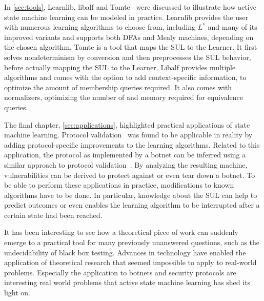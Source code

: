 \documentclass[multi,crop=false,class=article]{standalone}
\begin{document}
In \cref{sec:tools}, Learnlib, libalf and Tomte~\cite{Raffelt2009,Bollig2010,Tomte2014}
were discussed to illustrate how active state machine learning can be modeled in
practice. Learnlib provides the user with numerous learning algorithms to choose
from, including $L^*$ and many of its improved variants and supports both DFAs
and Mealy machines, depending on the chosen algorithm. Tomte is a tool that maps
the SUL to the Learner. It first solves nondeterminism by conversion and then
preprocesses the SUL behavior, before actually mapping the SUL to the Learner.
Libalf provides multiple algorithms and comes with the option to add
context-specific information, to optimize the amount of membership queries
required. It also comes with normalizers, optimizing the number of and memory
required for equivalence queries.

The final chapter, \cref{sec:applications}, highlighted practical applications of state
machine learning. Protocol validation~\cite{deRuiter2015} was found to be
applicable in reality by adding protocol-specific improvements to the
learning algorithms. Related to this application, the protocol as implemented
by a botnet can be inferred using a similar approach to protocol
validation~\cite{Cho2010}. By analyzing the resulting machine, vulnerabilities
can be derived to protect against or even tear down a botnet.
To be able to perform these applications in practice, modifications to known
algorithms have to be done. In particular, knowledge about the SUL can help to
predict outcomes or even enables the learning algorithm to be interrupted after
a certain state had been reached.

It has been interesting to see how a theoretical piece of work can suddenly
emerge to a practical tool for many previously unanswered questions, such as the
undecidability of black box testing. Advances in technology have enabled the
application of theoretical research that seemed impossible to apply to real-world
problems. Especially the application to botnets and security protocols are
interesting real world problems that active state machine learning has shed its
light on.
\end{document}
